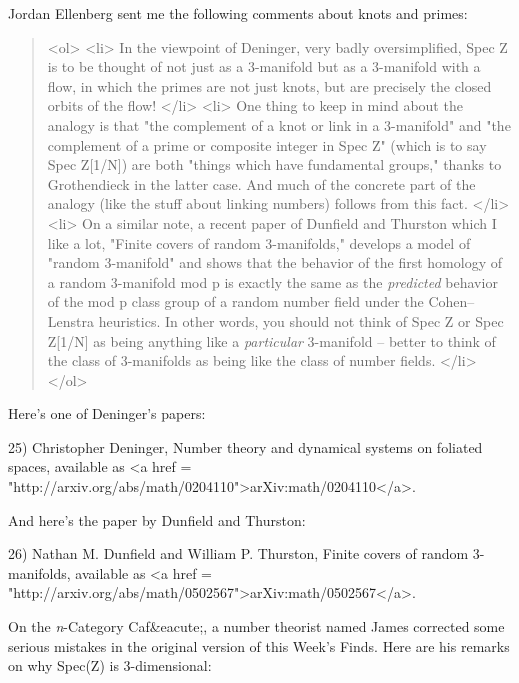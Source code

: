 Jordan Ellenberg sent me the following comments about knots and primes:

\begin{quote}

<ol>
<li>
In the viewpoint of Deninger, very badly
oversimplified, Spec Z is to be thought of not just as a
3-manifold but as a 3-manifold with
a flow, in which the primes are not just knots, but are precisely the
closed orbits of the flow!
</li>
<li>
One thing to keep in mind about the analogy is that "the complement of
a knot or link in a 3-manifold" and "the complement of a prime or composite
integer in Spec Z" (which is to say Spec Z[1/N])
are both "things which have fundamental groups," thanks to Grothendieck in
the latter case.  And much of the concrete part of the analogy (like the
stuff about linking numbers) follows from this
fact.
</li>
<li>
On a similar note, a recent paper of Dunfield and Thurston which
I like a lot, "Finite covers
of random 3-manifolds," develops a model of "random 3-manifold" and
shows that the behavior of the first
homology of a random 3-manifold mod p is exactly the same as the
\emph{predicted} behavior of the mod p class group of a random number
field under the Cohen--Lenstra heuristics.  In other words, you should
not think of Spec Z or Spec Z[1/N] as being anything
like a \emph{particular} 3-manifold -- better to think of the class of
3-manifolds as being like the class of number fields.
</li>
</ol>

\end{quote}

Here's one of Deninger's papers:

25) Christopher Deninger, Number theory and dynamical systems on
foliated spaces, available as <a href = "http://arxiv.org/abs/math/0204110">arXiv:math/0204110</a>.

And here's the paper by Dunfield and Thurston:

26) Nathan M. Dunfield and William P. Thurston, Finite covers of
random 3-manifolds, available as <a href = "http://arxiv.org/abs/math/0502567">arXiv:math/0502567</a>.

On the \emph{n}-Category Caf&eacute;, a number theorist named James
corrected some serious mistakes in the original version of this Week's
Finds.  Here are his remarks on why Spec(Z) is 3-dimensional:

